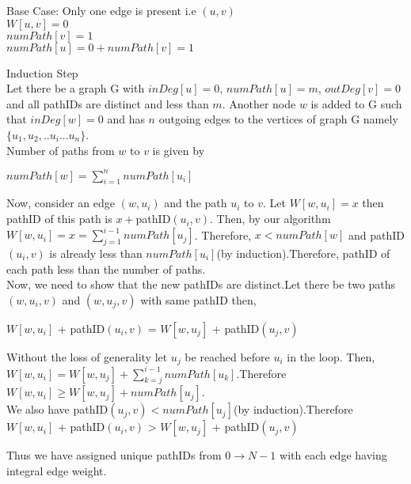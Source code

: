 \documentclass[a4paper,10pt]{article}
\begin{document}
\begin{description}
\item{Base Case:} Only one edge is present i.e $(u,v)$\\
$W[u,v] = 0$\\
$numPath[v] = 1$\\
$numPath[u] = 0 + numPath[v] =  1$\\
\item{Induction Step}\\
Let there be a graph G with $inDeg[u]=0$, $numPath[u]=m$, $outDeg[v]=0$ and all pathIDs are distinct and less than $m$.
Another node $w$ is added to G such that $inDeg[w]=0$ and has $n$ outgoing edges to the vertices of graph G namely $\{u_1,u_2,..u_i...u_n\}$.\\
Number of paths from $w$ to $v$ is given by \\\begin{center}$numPath[w] = \displaystyle\sum\limits_{i=1}^{n} numPath[u_i]$\end{center}
Now, consider an edge $(w,u_i)$ and the path $u_i$ to $v$. Let $W[w,u_i] = x$ then pathID of this path is $x + $pathID$(u_i,v)$. Then, by our algorithm $W[w,u_i] = x=\displaystyle\sum\limits_{j=1}^{i-1} numPath[u_j]$. Therefore, $x<numPath[w]$ and pathID$(u_i,v)$ is already less  than $numPath[u_i]$(by induction).Therefore, pathID of each path less than the number of paths.\\
Now, we need to show that the new pathIDs are distinct.Let there be two paths $(w,u_i,v)$ and $(w,u_j,v)$ with  same pathID then,\\
\begin{center}
$W[w,u_i]$ + pathID$(u_i,v)$ = $W[w,u_j]$ + pathID$(u_j,v)$\\
\end{center}
Without the loss of generality let $u_j$ be reached before $u_i$ in the loop. Then, \\$W[w,u_i]= W[w,u_j] + \displaystyle\sum\limits_{k=j}^{i-1} numPath[u_k]$.Therefore $W[w,u_i]\geq W[w,u_j]+numPath[u_j]$.\\We also have pathID$(u_j,v)<numPath[u_j]$(by induction).Therefore \\$W[w,u_i]$ + pathID$(u_i,v)$ > $W[w,u_j]$ + pathID$(u_j,v)$\\
\end{description}
Thus we have assigned unique pathIDs from $0\rightarrow N-1$ with each edge having integral edge weight.
\end{document}
